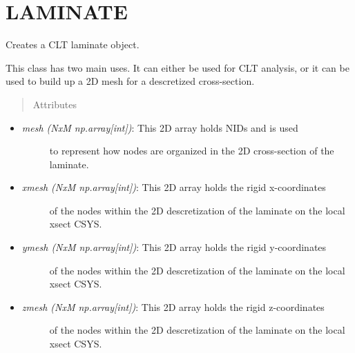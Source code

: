 \documentclass[letterpaper,10pt,english]{sphinxmanual}
\begin{document}
\section{LAMINATE}
\label{structures:laminate}

\begin{fulllineitems}
\label{structures:AeroComBAT.Structures.Laminate}
Creates a CLT laminate object.

This class has two main uses. It can either be used for CLT analysis, or it
can be used to build up a 2D mesh for a descretized cross-section.
\begin{quote}\begin{description}
\item[{Attributes}] \leavevmode
\end{description}\end{quote}
\begin{itemize}
\item {} \begin{description}
\item[{\emph{mesh (NxM np.array{[}int{]})}: This 2D array holds NIDs and is used}] \leavevmode
to represent how nodes are organized in the 2D cross-section of
the laminate.

\end{description}

\item {} \begin{description}
\item[{\emph{xmesh (NxM np.array{[}int{]})}: This 2D array holds the rigid x-coordinates}] \leavevmode
of the nodes within the 2D descretization of the laminate on the
local xsect CSYS.

\end{description}

\item {} \begin{description}
\item[{\emph{ymesh (NxM np.array{[}int{]})}: This 2D array holds the rigid y-coordinates}] \leavevmode
of the nodes within the 2D descretization of the laminate on the
local xsect CSYS.

\end{description}

\item {} \begin{description}
\item[{\emph{zmesh (NxM np.array{[}int{]})}: This 2D array holds the rigid z-coordinates}] \leavevmode
of the nodes within the 2D descretization of the laminate on the
local xsect CSYS.


\end{description}
\end{itemize}
\end{fulllineitems}
\end{document}
